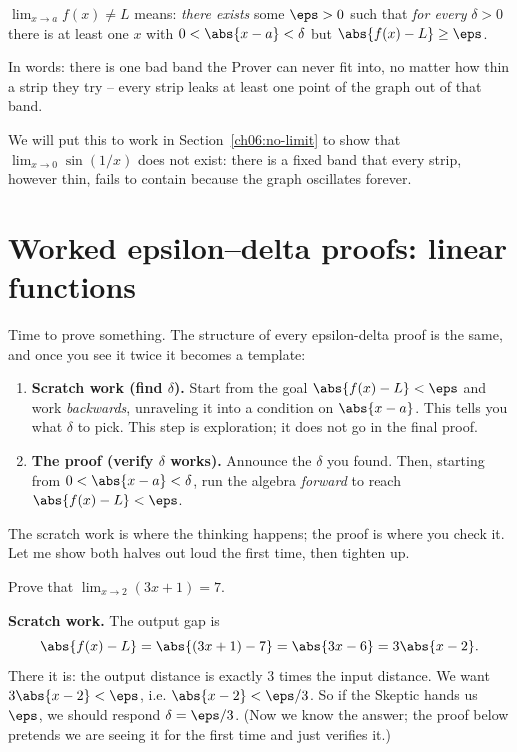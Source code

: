 \begin{focusbox}
$\displaystyle \lim_{x\to a} f(x) \ne L$ means: \emph{there exists} some
$\eps > 0$ such that \emph{for every} $\delta > 0$ there is at least one $x$ with
$0 < \abs{x-a} < \delta$ but $\abs{f(x)-L} \ge \eps$.

In words: there is one bad band the Prover can never fit into, no matter how
thin a strip they try -- every strip leaks at least one point of the graph out
of that band.
\end{focusbox}

We will put this to work in Section~\ref{ch06:no-limit} to show that
$\lim_{x\to 0}\sin(1/x)$ does not exist: there is a fixed band that every strip,
however thin, fails to contain because the graph oscillates forever.

\section{Worked epsilon--delta proofs: linear functions}
\label{ch06:linear}

Time to prove something. The structure of every epsilon-delta proof is the same,
and once you see it twice it becomes a template:

\begin{enumerate}
\item \textbf{Scratch work (find $\delta$).} Start from the goal
  $\abs{f(x)-L}<\eps$ and work \emph{backwards}, unraveling it into a condition
  on $\abs{x-a}$. This tells you what $\delta$ to pick. This step is
  exploration; it does not go in the final proof.
\item \textbf{The proof (verify $\delta$ works).} Announce the $\delta$ you
  found. Then, starting from $0<\abs{x-a}<\delta$, run the algebra
  \emph{forward} to reach $\abs{f(x)-L}<\eps$.
\end{enumerate}

The scratch work is where the thinking happens; the proof is where you check it.
Let me show both halves out loud the first time, then tighten up.

\begin{example}
\label{ch06:ex-linear}
Prove that $\displaystyle \lim_{x\to 2}(3x+1) = 7$.
\end{example}

\textbf{Scratch work.} The output gap is
\[
  \abs{f(x) - L} = \abs{(3x+1) - 7} = \abs{3x - 6} = 3\abs{x-2}.
\]
There it is: the output distance is exactly $3$ times the input distance. We want
$3\abs{x-2} < \eps$, i.e. $\abs{x-2} < \eps/3$. So if the Skeptic hands us
$\eps$, we should respond $\delta = \eps/3$. (Now we know the answer; the proof
below pretends we are seeing it for the first time and just verifies it.)

